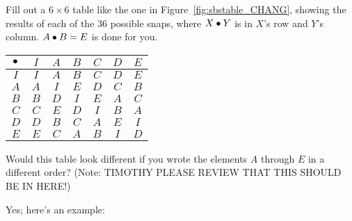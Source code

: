 \documentclass[../gatm_answers.tex]{subfiles}
\begin{document}
\begin{outer_problem}[start=1]
	\item Fill out a $6\times 6$ table like the one in Figure~\ref{fig:sbstable_CHANG}, showing the results of each of the $36$ possible snaps, where $X\bullet Y$ is in $X$'s row and $Y$'s column. $A\bullet B=E$ is done for you.
\end{outer_problem}

%             
\begin{center}
	\begin{tabular}{c|cccccc}
		\hline
		$\bullet$ & $I$ & $A$ & $B$ & $C$ & $D$ & $E$ \\ \hline
		\rowcolor{light-gray}
		$I$ & $I$ & $A$ & $B$ & $C$ & $D$ & $E$ \\
		$A$ & $A$ & $I$ & $E$ & $D$ & $C$ & $B$ \\
		\rowcolor{light-gray}
		$B$ & $B$ & $D$ & $I$ & $E$ & $A$ & $C$ \\
		$C$ & $C$ & $E$ & $D$ & $I$ & $B$ & $A$ \\
		\rowcolor{light-gray}
		$D$ & $D$ & $B$ & $C$ & $A$ & $E$ & $I$ \\
		$E$ & $E$ & $C$ & $A$ & $B$ & $I$ & $D$ \\ \hline
	\end{tabular}
\end{center}

\begin{outer_problem}
	\item Would this table look different if you wrote the elements $A$ through $E$ in a different order? (Note: TIMOTHY PLEASE REVIEW THAT THIS SHOULD BE IN HERE!)
\end{outer_problem}

\noindent Yes; here's an example:

\end{document}
